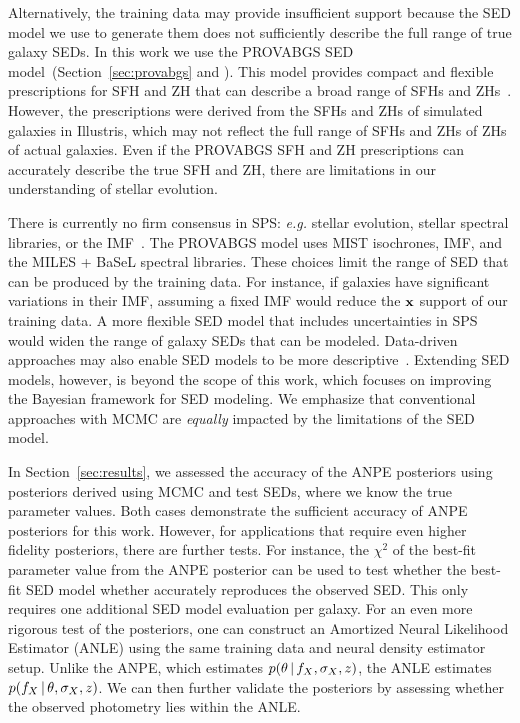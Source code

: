 Alternatively, the training data may provide insufficient support because the
SED model we use to generate them does not sufficiently describe the full range
of true galaxy SEDs. 
In this work we use the PROVABGS SED model~(Section~\ref{sec:provabgs} and
\citealt{hahn2022}). 
This model provides compact and flexible prescriptions for SFH and ZH that can
describe a broad range of SFHs and ZHs~\citep{hahn2022}.
However, the prescriptions were derived from the SFHs and ZHs of simulated
galaxies in Illustris, which may not reflect the full range of SFHs and ZHs of
ZHs of actual galaxies.
Even if the PROVABGS SFH and ZH prescriptions can accurately describe the true
SFH and ZH, there are limitations in our understanding of stellar evolution.

There is currently no firm consensus in SPS: \emph{e.g.} stellar evolution,
stellar spectral libraries, or the IMF~\citep[\emph{e.g.}][]{treu2010,
vandokkum2010, rosani2018, ge2019, sonnenfeld2019}.
The PROVABGS model uses MIST isochrones, \cite{chabrier2003} IMF, and the MILES
+ BaSeL spectral libraries. 
These choices limit the range of SED that can be produced by the training data. 
For instance, if galaxies have significant variations in their IMF, assuming a
fixed IMF would reduce the $\bf{x}$ support of our training data.  
A more flexible SED model that includes uncertainties in SPS would widen the
range of galaxy SEDs that can be modeled.
Data-driven approaches may also enable SED models to be more
descriptive~\citep[\emph{e.g.}][]{hogg2016, portillo2020}. 
Extending SED models, however, is beyond the scope of this work, which focuses
on improving the Bayesian framework for SED modeling.
We emphasize that conventional approaches with MCMC are \emph{equally} impacted
by the limitations of the SED model. 

In Section~\ref{sec:results}, we assessed the accuracy of the ANPE posteriors
using posteriors derived using MCMC and test SEDs, where we know the true
parameter values. 
Both cases demonstrate the sufficient accuracy of ANPE posteriors for this
work. 
However, for applications that require even higher fidelity posteriors, there
are further tests. 
For instance, the $\chi^2$ of the best-fit parameter value from the ANPE
posterior can be used to test whether the best-fit SED model whether accurately
reproduces the observed SED.
This only requires one additional SED model evaluation per galaxy. 
For an even more rigorous test of the posteriors, one can construct an
Amortized Neural Likelihood Estimator (ANLE) using the same training data and
neural density estimator setup. 
Unlike the ANPE, which estimates $p(\theta\,|\, f_X, \sigma_X, z)$, the ANLE
estimates $p(f_X \,|\, \theta, \sigma_X, z)$.
We can then further validate the posteriors by assessing whether the observed photometry lies within the ANLE. 

